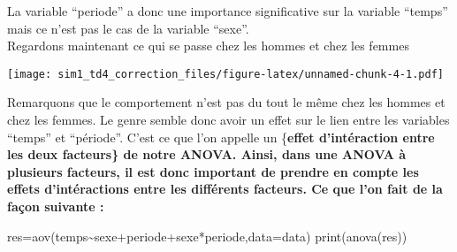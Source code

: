 \documentclass[
]{article}
\newenvironment{Shaded}{\begin{snugshade}}{\end{snugshade}}
\newcommand{\AttributeTok}[1]{\textcolor[rgb]{0.77,0.63,0.00}{#1}}
\newcommand{\DecValTok}[1]{\textcolor[rgb]{0.00,0.00,0.81}{#1}}
\newcommand{\FunctionTok}[1]{\textcolor[rgb]{0.00,0.00,0.00}{#1}}
\newcommand{\NormalTok}[1]{#1}
\newcommand{\OtherTok}[1]{\textcolor[rgb]{0.56,0.35,0.01}{#1}}
\newcommand{\SpecialCharTok}[1]{\textcolor[rgb]{0.00,0.00,0.00}{#1}}
\newcommand{\StringTok}[1]{\textcolor[rgb]{0.31,0.60,0.02}{#1}}
\begin{document}
La variable ``periode'' a donc une importance significative sur la
variable ``temps'' mais ce n'est pas le cas de la variable ``sexe''.\\

Regardons maintenant ce qui se passe chez les hommes et chez les femmes

\begin{Shaded}
\end{Shaded}

\texttt{[image: sim1\_td4\_correction\_files/figure-latex/unnamed-chunk-4-1.pdf]}

Remarquons que le comportement n'est pas du tout le même chez les hommes
et chez les femmes. Le genre semble donc avoir un effet sur le lien
entre les variables ``temps'' et ``période''. C'est ce que l'on appelle
un \{\bf effet d'intéraction entre les deux facteurs\} de notre ANOVA.
Ainsi, dans une ANOVA à plusieurs facteurs, il est donc important de
prendre en compte les effets d'intéractions entre les différents
facteurs. Ce que l'on fait de la façon suivante :

\begin{Shaded}
\begin{Highlighting}[]
\NormalTok{res}\OtherTok{=}\FunctionTok{aov}\NormalTok{(temps}\SpecialCharTok{\textasciitilde{}}\NormalTok{sexe}\SpecialCharTok{+}\NormalTok{periode}\SpecialCharTok{+}\NormalTok{sexe}\SpecialCharTok{*}\NormalTok{periode,}\AttributeTok{data=}\NormalTok{data) }
\FunctionTok{print}\NormalTok{(}\FunctionTok{anova}\NormalTok{(res))}
\end{Highlighting}
\end{Shaded}
\end{document}
